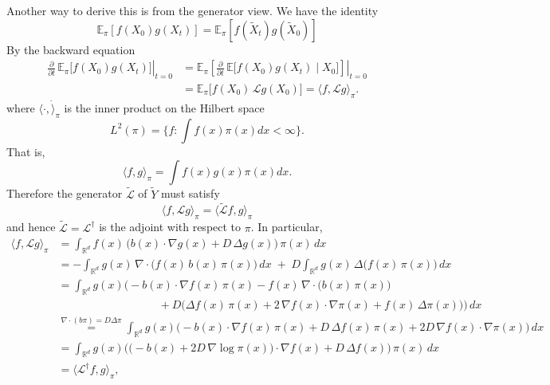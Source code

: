 \documentclass[11pt]{article}
\begin{document}
Another way to derive this is from the generator view. We have the identity 
\begin{equation}
{\mathbb E}_{\pi}[f(X_0)g(X_t)] = {\mathbb E}_{\pi}[f(\tilde{X}_t)g(\tilde{X}_0)] 
\end{equation}
By the backward equation 
\begin{equation}
\begin{aligned}
\left.\frac{\partial}{\partial t}\,\mathbb{E}_{\pi}\big[f(X_0)g(X_t)\big]\right|_{t=0}
&=
\left.\mathbb{E}_{\pi}\!\left[ \frac{\partial}{\partial t}\,\mathbb{E}\big[f(X_0)g(X_t)\mid X_0\big]\right]\right|_{t=0} \\
&=
\mathbb{E}_{\pi}\big[f(X_0)\,\mathcal{L}g(X_0)\big]
=
\langle f, \mathcal{L}g\rangle_{\pi}.
\end{aligned}
\end{equation}
where $\langle \cdot,\dot \rangle_{\pi}$ is the inner product on the Hilbert space
\begin{equation}
L^2(\pi) = \{f: \int f(x)\pi(x)dx < \infty \}.
\end{equation}
That is, 
\begin{equation}
\langle f,g \rangle_{\pi} = \int f(x)g(x)\pi(x)dx.
\end{equation}
Therefore the generator  $\tilde{ \mathcal{L}}$ of $\tilde{Y}$ must satisfy 
\begin{equation}
\langle f, \mathcal{L}g\rangle_{\pi} = \langle \tilde{ \mathcal{L}}f,g\rangle_{\pi}
\end{equation}
and hence $\tilde{ \mathcal{L}} =\mathcal{L}^{\dagger}$ is the adjoint with respect to $\pi$. 
In particular, 
\begin{align}
\langle f,\mathcal L g\rangle_{\pi}
&= \int_{\mathbb R^d} f(x)\,\big(b(x)\cdot\nabla g(x) + D\,\Delta g(x)\big)\,\pi(x)\,dx \\[0.3em]
&= -\int_{\mathbb R^d} g(x)\,\nabla\!\cdot\!\big(f(x)\,b(x)\,\pi(x)\big)\,dx
   \;+\;D\int_{\mathbb R^d} g(x)\,\Delta\big(f(x)\,\pi(x)\big)\,dx \\[0.3em]
&= \int_{\mathbb R^d} g(x)\Big(
   -b(x)\cdot\nabla f(x)\,\pi(x)
   -f(x)\,\nabla\!\cdot\!\big(b(x)\,\pi(x)\big) \\
&\hspace{5em}
   \qquad\qquad
   +D\big(\Delta f(x)\,\pi(x)
         +2\,\nabla f(x)\cdot\nabla\pi(x)
         +f(x)\,\Delta\pi(x)\big)
   \Big)\,dx \\[0.3em]
&\overset{\nabla\cdot(b\pi)=D\Delta\pi}{=}
   \int_{\mathbb R^d} g(x)\Big(
   -b(x)\cdot\nabla f(x)\,\pi(x)
   +D\,\Delta f(x)\,\pi(x)
   +2D\,\nabla f(x)\cdot\nabla\pi(x)
   \Big)\,dx \\[0.3em]
&= \int_{\mathbb R^d} g(x)\Big(
   \big(-b(x)+2D\,\nabla\log\pi(x)\big)\cdot\nabla f(x)
   +D\,\Delta f(x)
   \Big)\,\pi(x)\,dx \\[0.3em]
&= \langle \mathcal L^{\dagger} f, g\rangle_{\pi},
\end{align}
\end{document}
